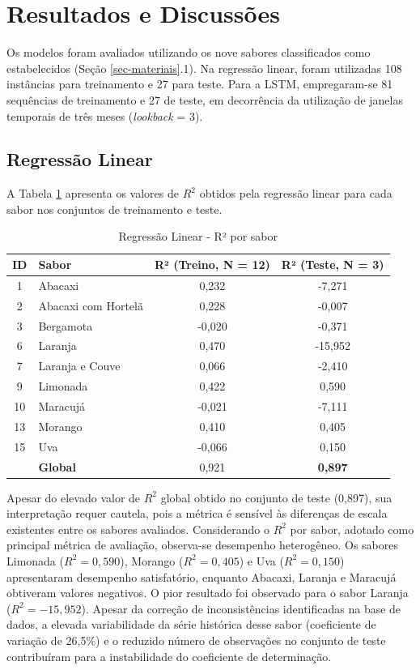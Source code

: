 \section{Resultados e Discussões}
\label{sec-resultados}

Os modelos foram avaliados utilizando os nove sabores classificados como estabelecidos (Seção \ref{sec-materiais}.1). Na regressão linear, foram utilizadas 108 instâncias para treinamento e 27 para teste. Para a LSTM, empregaram-se 81 sequências de treinamento e 27 de teste, em decorrência da utilização de janelas temporais de três meses (\textit{lookback} = 3).

\subsection{Regressão Linear}

A Tabela \ref{tab:predlinear} apresenta os valores de $R^2$ obtidos pela regressão linear para cada sabor nos conjuntos de treinamento e teste.

\begin{table}[htpb]
\centering
\caption{Regressão Linear - R² por sabor}
\label{tab:predlinear} 
\begin{tabular} {cp{3.6cm}cc} \hline
\textbf{ID}&\textbf{Sabor} & \textbf{R² (Treino, N = 12)} & \textbf{R² (Teste, N = 3)} \\ \hline
1&Abacaxi & 0,232 & -7,271\\ 
2&Abacaxi com Hortelã & 	0,228 & -0,007\\ 
3&Bergamota & -0,020 & -0,371\\ 
6&Laranja & 0,470 & -15,952\\ 
7&Laranja e Couve & 0,066 & -2,410\\ 
9&Limonada & 0,422 & 0,590\\ 
10&Maracujá & -0,021 & -7,111\\ 
13&Morango & 0,410 & 0,405\\ 
15&Uva & -0,066 & 0,150\\ \hline
&\textbf{Global} & 0,921 & \textbf{0,897}\\\hline
\end{tabular}
\end{table}
\vspace{5em}
Apesar do elevado valor de $R^2$ global obtido no conjunto de teste (0,897), sua interpretação requer cautela, pois a métrica é sensível às diferenças de escala existentes entre os sabores avaliados. Considerando o $R^2$ por sabor, adotado como principal métrica de avaliação, observa-se desempenho heterogêneo. Os sabores Limonada ($R^2=0,590$), Morango ($R^2=0,405$) e Uva ($R^2=0,150$) apresentaram desempenho satisfatório, enquanto Abacaxi, Laranja e Maracujá obtiveram valores negativos. O pior resultado foi observado para o sabor Laranja ($R^2=-15,952$). Apesar da correção de inconsistências identificadas na base de dados, a elevada variabilidade da série histórica desse sabor (coeficiente de variação de 26,5\%) e o reduzido número de observações no conjunto de teste contribuíram para a instabilidade do coeficiente de determinação.


